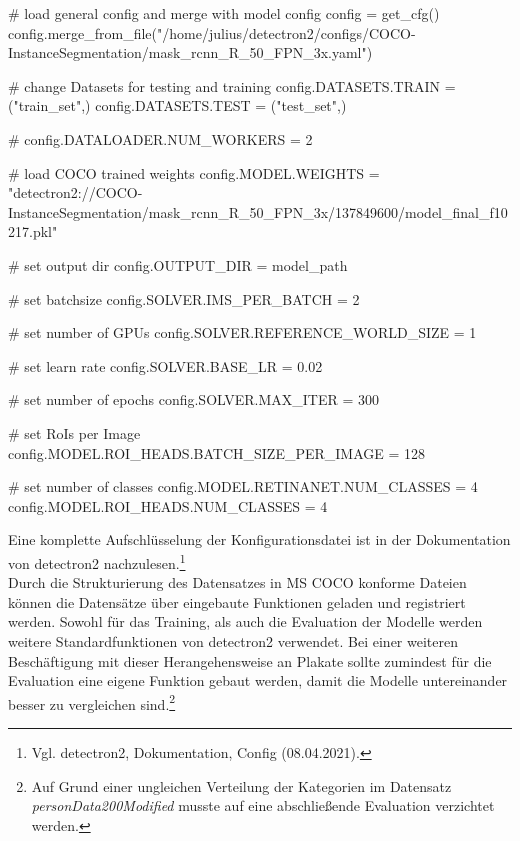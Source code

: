 \documentclass[a4paper,12pt,ngerman]{article}
\begin{document}
\begin{python}
	# load general config and merge with model config
    config = get_cfg()
    config.merge_from_file("/home/julius/detectron2/configs/COCO-InstanceSegmentation/mask_rcnn_R_50_FPN_3x.yaml")
    
    # change Datasets for testing and training
    config.DATASETS.TRAIN = ("train_set",)
    config.DATASETS.TEST = ("test_set",)
    
    # config.DATALOADER.NUM_WORKERS = 2
    
    # load COCO trained weights 
    config.MODEL.WEIGHTS = "detectron2://COCO-InstanceSegmentation/mask_rcnn_R_50_FPN_3x/137849600/model_final_f10217.pkl"
    
    # set output dir
    config.OUTPUT_DIR = model_path

    # set batchsize
    config.SOLVER.IMS_PER_BATCH = 2
    
    # set number of GPUs
    config.SOLVER.REFERENCE_WORLD_SIZE = 1

    # set learn rate
    config.SOLVER.BASE_LR = 0.02

    # set number of epochs
    config.SOLVER.MAX_ITER = 300

    # set RoIs per Image
    config.MODEL.ROI_HEADS.BATCH_SIZE_PER_IMAGE = 128

    # set number of classes
    config.MODEL.RETINANET.NUM_CLASSES = 4
    config.MODEL.ROI_HEADS.NUM_CLASSES = 4
\end{python}

Eine komplette Aufschlüsselung der Konfigurationsdatei ist in der Dokumentation von detectron2 nachzulesen.\footnote{Vgl. detectron2, Dokumentation, Config (08.04.2021).} \\

Durch die Strukturierung des Datensatzes in MS COCO konforme Dateien können die Datensätze über eingebaute Funktionen geladen und registriert werden. Sowohl für das Training, als auch die Evaluation der Modelle werden weitere Standardfunktionen von detectron2 verwendet. Bei einer weiteren Beschäftigung mit dieser Herangehensweise an Plakate sollte zumindest für die Evaluation eine eigene Funktion gebaut werden, damit die Modelle untereinander besser zu vergleichen sind.\footnote{Auf Grund einer ungleichen Verteilung der Kategorien im Datensatz \textit{personData200Modified} musste auf eine abschließende Evaluation verzichtet werden.} \\
\end{document}
